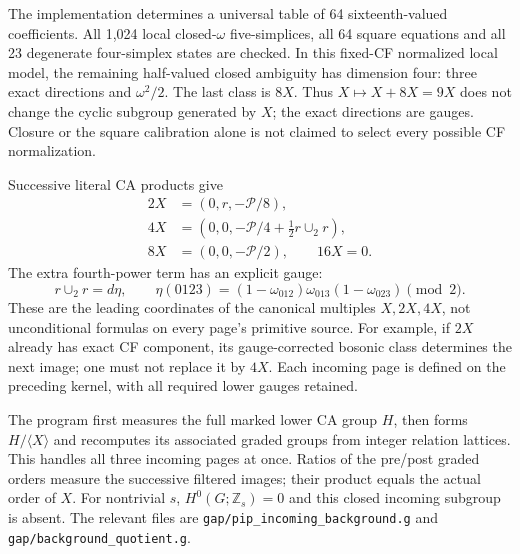\documentclass[11pt]{article}
\newcommand{\Z}{\mathbb Z}
\newcommand{\PP}{\mathcal P}
\newcommand{\pathref}[1]{{\small\nolinkurl{#1}}}
\begin{document}
The implementation determines a universal table of 64 sixteenth-valued
coefficients. All 1,024 local closed-$\omega$ five-simplices, all 64
square equations and all 23 degenerate four-simplex states are checked.
In this fixed-CF normalized local model, the remaining half-valued
closed ambiguity has dimension four: three exact directions and
$\omega^2/2$. The last class is $8X$. Thus $X\mapsto X+8X=9X$
does not change the cyclic subgroup generated by $X$; the exact
directions are gauges.
Closure or the square calibration alone is not claimed to select every
possible CF normalization.

Successive literal CA products give
\begin{align}\label{eq:powers}
 2X&=(0,r,-\PP/8),\\
 4X&=(0,0,-\PP/4+\tfrac12 r\cup_2r),\\
 8X&=(0,0,-\PP/2),\qquad 16X=0.
\end{align}
The extra fourth-power term has an explicit gauge:
\begin{equation}
 r\cup_2r=d\eta,\qquad
 \eta(0123)=(1-\omega_{012})\omega_{013}(1-\omega_{023})\pmod2.
\end{equation}
These are the leading coordinates of the canonical multiples
$X,2X,4X$, not unconditional formulas on every page's primitive source.
For example, if $2X$ already has exact CF component, its gauge-corrected
bosonic class determines the next image; one must not replace it by
$4X$. Each incoming page is defined on the preceding kernel, with
all required lower gauges retained.

The program first measures the full marked lower CA group $H$, then
forms $H/\langle X\rangle$ and recomputes its associated graded groups
from integer relation lattices. This handles all three incoming pages
at once. Ratios of the pre/post graded orders measure the successive
filtered images; their product equals the actual order of $X$.
For nontrivial $s$, $H^0(G;\Z_s)=0$ and this closed incoming subgroup
is absent. The relevant files are
\pathref{gap/pip_incoming_background.g} and
\pathref{gap/background_quotient.g}.

\newpage
\end{document}
